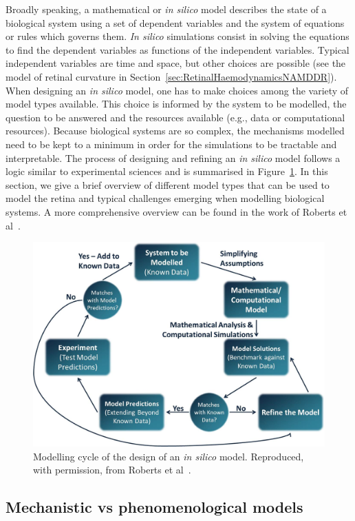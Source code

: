 \documentclass{article}
\begin{document}
Broadly speaking, a mathematical or \textit{in silico} model describes the state of a biological system using a set of dependent variables and the system of equations or rules which governs them.
\textit{In silico} simulations consist in solving the equations to find the dependent variables as functions of the independent variables.
Typical independent variables are time and space, but other choices are possible (see the model of retinal curvature in Section~\ref{sec:RetinalHaemodynamicsNAMDDR}).
When designing an \textit{in silico} model, one has to make choices among the variety of model types available.
This choice is informed by the system to be modelled, the question to be answered and the resources available (e.g., data or computational resources).
Because biological systems are so complex, the mechanisms modelled need to be kept to a minimum in order for the simulations to be tractable and interpretable.
The process of designing and refining an \textit{in silico} model follows a logic similar to experimental sciences and is summarised in Figure~\ref{fig:ModellingCycle}.
In this section, we give a brief overview of different model types that can be used to model the retina and typical challenges emerging when modelling biological systems.
A more comprehensive overview can be found in the work of Roberts et al~\cite{Roberts_2016}.

\begin{figure}[t!]
  \centering
  \includegraphics[width=.9\linewidth]{ModellingCycle}
  \caption{Modelling cycle of the design of an \textit{in silico} model. Reproduced, with permission, from Roberts et al~\cite{Roberts_2016}.}
  \label{fig:ModellingCycle}
\end{figure}

\subsection{Mechanistic vs phenomenological models}
\end{document}
